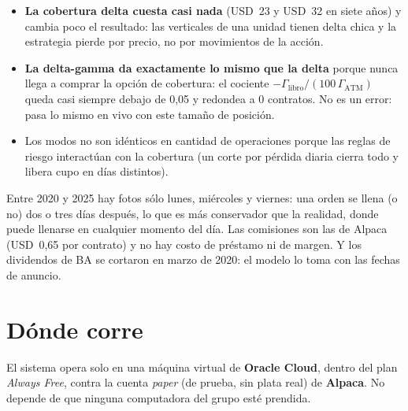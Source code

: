 \documentclass[11pt,a4paper]{article}
\newcommand{\usd}[1]{USD~#1}
\begin{document}
\begin{itemize}
\item \textbf{La cobertura delta cuesta casi nada} (\usd{23} y \usd{32} en siete años) y cambia poco el resultado: las
  verticales de una unidad tienen delta chica y la estrategia pierde por precio, no por movimientos de la acción.
\item \textbf{La delta-gamma da exactamente lo mismo que la delta} porque nunca llega a comprar la opción de
  cobertura: el cociente $-\Gamma_{\text{libro}}/(100\,\Gamma_{\text{ATM}})$ queda casi siempre debajo de 0,05 y
  redondea a 0 contratos. No es un error: pasa lo mismo en vivo con este tamaño de posición.
\item Los modos no son idénticos en cantidad de operaciones porque las reglas de riesgo interactúan con la cobertura
  (un corte por pérdida diaria cierra todo y libera cupo en días distintos).
\end{itemize}

\begin{ojo}
Entre 2020 y 2025 hay fotos sólo lunes, miércoles y viernes: una orden se llena (o no) dos o tres días después, lo
que es más conservador que la realidad, donde puede llenarse en cualquier momento del día. Las comisiones son las
de Alpaca (\usd{0,65} por contrato) y no hay costo de préstamo ni de margen. Y los dividendos de BA se cortaron en
marzo de 2020: el modelo lo toma con las fechas de anuncio.
\end{ojo}

\newpage
\section{Dónde corre}

El sistema opera solo en una máquina virtual de \textbf{Oracle Cloud}, dentro del plan \emph{Always Free}, contra la
cuenta \emph{paper} (de prueba, sin plata real) de \textbf{Alpaca}. No depende de que ninguna computadora del grupo
esté prendida.
\end{document}
